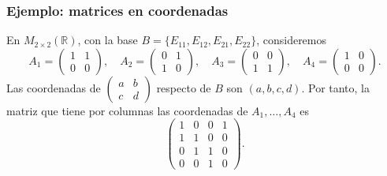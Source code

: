 \begin{frame}
    \frametitle{Ejemplo: matrices en coordenadas}

    \begin{example}
        En \(M_{2\times2}(\mathbb{R})\), con la base
        \(B=\{E_{11},E_{12},E_{21},E_{22}\}\), consideremos
        \[
            A_1=\begin{pmatrix}1&1\\0&0\end{pmatrix},\quad
            A_2=\begin{pmatrix}0&1\\1&0\end{pmatrix},\quad
            A_3=\begin{pmatrix}0&0\\1&1\end{pmatrix},\quad
            A_4=\begin{pmatrix}1&0\\0&0\end{pmatrix}.
        \]
        Las coordenadas de \(\begin{pmatrix}a&b\\c&d\end{pmatrix}\) respecto de
        \(B\) son \((a,b,c,d) \). Por tanto, la matriz que tiene por
        columnas las coordenadas de \(A_1,\ldots,A_4\) es
        \[
            \begin{pmatrix}
                1&0&0&1\\
                1&1&0&0\\
                0&1&1&0\\
                0&0&1&0
            \end{pmatrix}.
        \]
    \end{example}
\end{frame}


